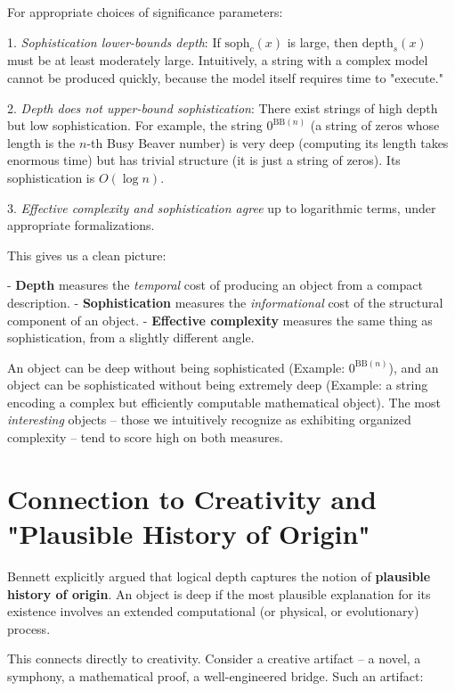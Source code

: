\begin{theorem}
For appropriate choices of significance parameters:

1. \textit{Sophistication lower-bounds depth}: If $\text{soph}_c(x)$ is large, then $\text{depth}_s(x)$ must be at least moderately large. Intuitively, a string with a complex model cannot be produced quickly, because the model itself requires time to "execute."

2. \textit{Depth does not upper-bound sophistication}: There exist strings of high depth but low sophistication. For example, the string $0^{\text{BB}(n)}$ (a string of zeros whose length is the $n$-th Busy Beaver number) is very deep (computing its length takes enormous time) but has trivial structure (it is just a string of zeros). Its sophistication is $O(\log n)$.

3. \textit{Effective complexity and sophistication agree} up to logarithmic terms, under appropriate formalizations.

This gives us a clean picture:

- \textbf{Depth} measures the \textit{temporal} cost of producing an object from a compact description.
- \textbf{Sophistication} measures the \textit{informational} cost of the structural component of an object.
- \textbf{Effective complexity} measures the same thing as sophistication, from a slightly different angle.

An object can be deep without being sophisticated (Example: $0^{\text{BB}(n)}$), and an object can be sophisticated without being extremely deep (Example: a string encoding a complex but efficiently computable mathematical object). The most \textit{interesting} objects -- those we intuitively recognize as exhibiting organized complexity -- tend to score high on both measures.
\end{theorem}

\section{Connection to Creativity and "Plausible History of Origin"}

Bennett explicitly argued that logical depth captures the notion of \textbf{plausible history of origin}. An object is deep if the most plausible explanation for its existence involves an extended computational (or physical, or evolutionary) process.

This connects directly to creativity. Consider a creative artifact -- a novel, a symphony, a mathematical proof, a well-engineered bridge. Such an artifact:

